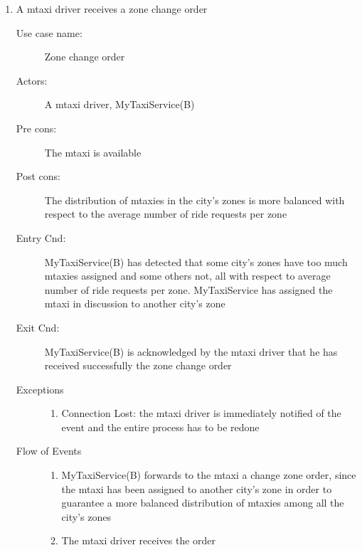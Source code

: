 \documentclass[11pt]{article} %
\begin{document}
\begin{enumerate}
	
	      \item A mtaxi driver receives a zone change order
		\begin{description}
		        \item [Use case name:] Zone change order
		        \item [Actors:] A mtaxi driver, MyTaxiService(B)
		        \item [Pre cons:] The mtaxi is available
		        \item [Post cons:] The distribution of mtaxies in the city's zones is more balanced
		        with respect to the average number of ride requests per zone
		        \item [Entry Cnd:] MyTaxiService(B) has detected that some city's zones have too much mtaxies assigned
		        and some others not, all with respect to average number of ride requests per zone. MyTaxiService
		        has assigned the mtaxi in discussion to another city's zone
		        \item [Exit Cnd:] MyTaxiService(B) is acknowledged by the mtaxi driver that he has received successfully
		        the zone change order
		        \item [Exceptions]\hfill
			\begin{enumerate}
			          \item Connection Lost: the mtaxi driver is immediately notified of the event and the entire process has to be redone
			\end{enumerate}
		        \item [Flow of Events]\hfill
			\begin{enumerate}
			          \item MyTaxiService(B) forwards to the mtaxi a change zone order, since the mtaxi has been assigned to another city's zone in order to guarantee
			          a more balanced distribution of mtaxies among all the city's zones
			          \item The mtaxi driver receives the order
			\end{enumerate}
		\end{description}
	

\end{enumerate}
\end{document}
